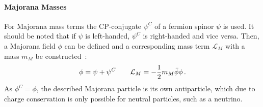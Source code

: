 \paragraph{Majorana Masses}
For Majorana mass terms the CP-conjugate $\psi^C$ of a fermion spinor $\psi$ is used. It should be noted that if $\psi$ is left-handed, $\psi^C$ is right-handed and vice versa. Then, a Majorana field $\phi$ can be defined and a corresponding mass term $\mathcal{L}_M$ with a mass $m_M$ be constructed~\cite{zuber2011neutrino}:
\begin{equation}
\phi = \psi + \psi^C \qquad \mathcal{L}_M = -\frac{1}{2}m_M \bar\phi \phi \text{\,.}
\end{equation}
As $\phi^C=\phi$, the described Majorana particle is its own antiparticle, which due to charge conservation is only possible for neutral particles, such as a neutrino.

